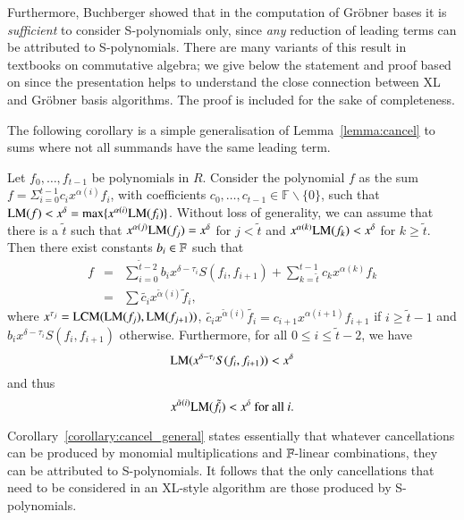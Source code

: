 Furthermore, Buchberger showed that in the computation of Gr\"obner bases it is \emph{sufficient} to consider S-poly\-nomials only, since \emph{any }reduction of leading terms can be attributed to S-polynomials. 
There are many variants of this result in textbooks on commutative algebra; we give below the statement and proof based on \cite{Cox1992} since the presentation helps to understand the close connection between 
XL and Gr\"obner basis algorithms.
The proof is included for the sake of completeness.
   
The following corollary is a simple generalisation of Lemma~\ref{lemma:cancel} to sums where not all summands have the same leading term.
\begin{corollary}
\label{corollary:cancel_general}
Let $f_0,\ldots,f_{t-1}$ be polynomials in $R$. 
Consider the polynomial $f$ as the sum $f = \Sigma^{t-1}_{i=0} c_ix^{\alpha(i)}f_i$, with coefficients 
$c_0, \ldots, c_{t-1} \in \mathbb{F}\backslash\{0\}$,
such that $\textsc{LM}(f) < x^\delta = \max\{x^{\alpha(i)}\textsc{LM}(f_i)\}$. 
Without loss of generality, we can assume that there is a $\tilde{t}$ such that $x^{\alpha(j)}\textsc{LM}(f_j) = x^\delta$ for $j < \tilde{t}$ and $x^{\alpha(k)}\textsc{LM}(f_k) < x^\delta$ for $k \geq \tilde{t}$.  
Then there exist constants $b_{i} \in {\mathbb F}$ such that
\begin{eqnarray*}
f &=& \sum_{i=0}^{\tilde{t}-2} b_{i}x^{\delta-\tau_{i}}S(f_i,f_{i+1}) + \sum_{k=\tilde{t}}^{t-1} c_kx^{\alpha(k)}f_k\\
 &=& \sum \tilde{c_i}x^{\tilde{\alpha}(i)}\tilde{f}_i,
\end{eqnarray*}
where \(x^{\tau_{j}} = \textsc{LCM}(\textsc{LM}(f_{j}),\textsc{LM}(f_{j+1}))\), $\tilde{c_i} x^{\tilde{\alpha}(i)} \tilde{f_i} = c_{i+1} x^{\alpha(i+1)} f_{i+1}$ if $i\geq \tilde{t}-1$ and $b_{i}x^{\delta-\tau_{i}}S(f_i,f_{i+1})$ otherwise. Furthermore, for all $0 \leq i \leq \tilde{t}-2$, we have $$\textsc{LM}(x^{\delta-\tau_{i}}S(f_i,f_{i+1})) < x^\delta$$ and thus 
$$
x^{\tilde{\alpha}(i)}\textsc{LM}(\tilde{f}_i) < x^\delta \mbox{  for all } i.
$$
\end{corollary}

Corollary~\ref{corollary:cancel_general} states essentially that whatever cancellations can be produced by monomial multiplications and ${\mathbb F}$-linear combinations, they can be attributed to S-polynomials. It follows that 
the only cancellations that need to be considered in an XL-style algorithm are those produced by S-polynomials. 


